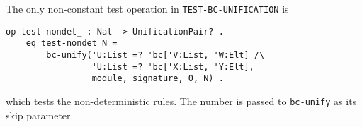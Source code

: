 \documentclass[11pt]{article}
\begin{document}

\vspace{1ex}

The only non-constant test operation in \lstinline|TEST-BC-UNIFICATION| is
\begin{lstlisting}[language=Maude, style=smalllisting]
    op test-nondet_ : Nat -> UnificationPair? .
    eq test-nondet N =
        bc-unify('U:List =? 'bc['V:List, 'W:Elt] /\
                 'U:List =? 'bc['X:List, 'Y:Elt],
                 module, signature, 0, N) .
\end{lstlisting}
which tests the non-deterministic rules. The number is passed to
\lstinline|bc-unify| as its skip parameter.
\vspace{1ex}


\end{document}
